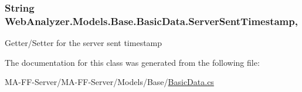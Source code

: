 \subsubsection[{Server\+Sent\+Timestamp}]{\setlength{\rightskip}{0pt plus 5cm}String Web\+Analyzer.\+Models.\+Base.\+Basic\+Data.\+Server\+Sent\+Timestamp\hspace{0.3cm}{\ttfamily [get]}, {\ttfamily [set]}}\label{class_web_analyzer_1_1_models_1_1_base_1_1_basic_data_af2791f5084f56826a6d6987e3a939c94}


Getter/\+Setter for the server sent timestamp 



The documentation for this class was generated from the following file\+:\begin{DoxyCompactItemize}
\item 
M\+A-\/\+F\+F-\/\+Server/\+M\+A-\/\+F\+F-\/\+Server/\+Models/\+Base/\hyperlink{_basic_data_8cs}{Basic\+Data.\+cs}\end{DoxyCompactItemize}
